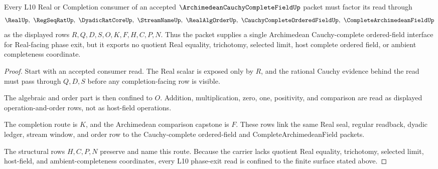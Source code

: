 \begin{theorem}
\label{thm:archimedean-cauchy-complete-field-l10-exit-route}
Every L10 Real or Completion consumer of an accepted $\ArchimedeanCauchyCompleteFieldUp$ packet must factor its read through
$$
\RealUp,\ \RegSeqRatUp,\ \DyadicRatCoreUp,\ \StreamNameUp,\ \RealAlgOrderUp,\ \CauchyCompleteOrderedFieldUp,\ \CompleteArchimedeanFieldUp
$$
as the displayed rows $R,Q,D,S,O,K,F,H,C,P,N$. Thus the packet supplies a single Archimedean Cauchy-complete ordered-field interface for Real-facing phase exit, but it exports no quotient Real equality, trichotomy, selected limit, host complete ordered field, or ambient completeness coordinate.
\end{theorem}
\begin{proof}
Start with an accepted consumer read. The Real scalar is exposed only by $R$, and the rational Cauchy evidence behind the read must pass through $Q,D,S$ before any completion-facing row is visible.

The algebraic and order part is then confined to $O$. Addition, multiplication, zero, one, positivity, and comparison are read as displayed operation-and-order rows, not as host-field operations.

The completion route is $K$, and the Archimedean comparison capstone is $F$. These rows link the same Real seal, regular readback, dyadic ledger, stream window, and order row to the Cauchy-complete ordered-field and CompleteArchimedeanField packets.

The structural rows $H,C,P,N$ preserve and name this route. Because the carrier lacks quotient Real equality, trichotomy, selected limit, host-field, and ambient-completeness coordinates, every L10 phase-exit read is confined to the finite surface stated above.
\end{proof}


